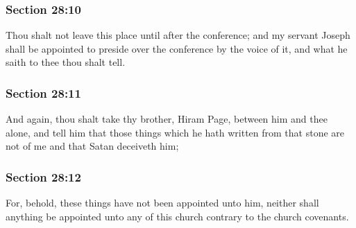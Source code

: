 	\subsubsection{Section 28:10} %
		\label{DC28-10}

		Thou shalt not leave this place until after the conference; and my servant Joseph shall be appointed to preside over the conference by the voice of it, and what he saith to thee thou shalt tell.


	\subsubsection{Section 28:11} %
		\label{DC28-11}

		And again, thou shalt take thy brother, Hiram Page, between him and thee alone, and tell him that those things which he hath written from that stone are not of me and that Satan deceiveth him;


	\subsubsection{Section 28:12} %
		\label{DC28-12}

		For, behold, these things have not been appointed unto him, neither shall anything be appointed unto any of this church contrary to the church covenants.


